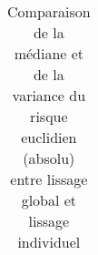 \begin{table}[H]
\begin{tabularx}{\textwidth}{ccccXXXX}
        \bottomrule
    \end{tabularx}
    \caption{Comparaison de la médiane et de la variance du risque euclidien (absolu) entre lissage global et lissage individuel}
    \label{tab:couple_1312_indiv_vs_glob}
    \end{table}
    